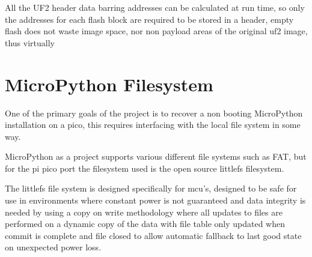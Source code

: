 All the UF2 header data barring addresses can be calculated at run time, so only the addresses for each flash block are required to be stored in a header, empty flash does not waste image space, nor non payload areas of the original uf2 image, thus virtually

\clearpage
\section{MicroPython Filesystem}
One of the primary goals of the project is to recover a non booting MicroPython installation on a pico, this requires interfacing with the local file system in some way.

MicroPython as a project supports various different file systems such as FAT, but for the pi pico port the filesystem used is the open source littlefs filesystem\cite{MicroPythonProject2023}.

The littlefs file system is designed specifically for \gls{mcu}'s, designed to be safe for use in environments where constant power is not guaranteed and data integrity is needed by using a copy on write methodology where all updates to files are performed on a dynamic copy of the data with file table only updated when commit is complete and file closed to allow automatic fallback to last good state on unexpected power loss.





